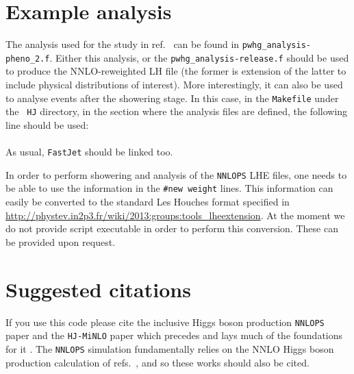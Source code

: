 \documentclass[11pt,a4paper]{article}
\newcommand{\noun}[1]{{\tt #1}}
\newcommand{\HJMINLO}{\noun{HJ-MiNLO}}
\newcommand{\NNLOPS}{\noun{NNLOPS}}
\newcommand{\FASTJET}{\noun{FastJet}}
\begin{document}
\section{Example analysis\label{sec:Analysis}}

The analysis used for the study in
ref.~\cite{Hamilton:2013fea} can be found in
{\tt{pwhg\_analysis-pheno\_2.f}}. Either this analysis, or the {\tt pwhg\_analysis-release.f} should be used to 
produce the NNLO-reweighted LH file (the former is extension of the latter to include physical distributions of interest).
%
More interestingly, it can also be used to analyse events after the
showering stage. In this case, in the {\tt Makefile} under the {\tt
  HJ} directory, in the section where the analysis files are defined,
the following line should be used:
\vspace{3mm}\\
\vspace{3mm}\\
%
As usual, \FASTJET{} should be linked too. 

In order to perform showering and analysis of the \NNLOPS{} LHE files,
one needs to be able to use the information in the {\tt \#new weight}
lines. This information can easily be converted to the standard Les
Houches format specified in
\url{http://phystev.in2p3.fr/wiki/2013:groups:tools_lheextension}. At
the moment we do not provide script executable in order to perform
this conversion. These can be provided upon request.

\section{Suggested citations}
If you use this code please cite the inclusive Higgs boson production
\NNLOPS{} paper \cite{Hamilton:2013fea} and the \HJMINLO{} paper which
precedes and lays much of the foundations for it \cite{Hamilton:2012rf}.
The \NNLOPS{} simulation fundamentally relies on the NNLO Higgs boson
production calculation of refs.~\cite{Catani:2007vq,Grazzini:2008tf},
and so these works should also be cited.
\end{document}
